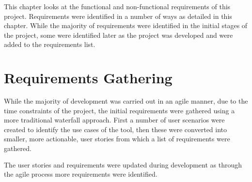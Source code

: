 \documentclass[l4proj.tex]{subfiles}
\begin{document}
    

This chapter looks at the functional and non-functional requirements of this project. Requirements were identified in a number of ways as detailed in this chapter. While the majority of requirements were identified in the initial stages of the project, some were identified later as the project was developed and were added to the requirements list.

\section{Requirements Gathering}
While the majority of development was carried out in an agile manner, due to the time constraints of the project, the initial requirements were gathered using a more traditional waterfall approach. First a number of user scenarios were created to identify the use cases of the tool, then these were converted into smaller, more actionable, user stories from which a list of requirements were gathered. 

The user stories and requirements were updated during development as through the agile process more requirements were identified.
\end{document}
